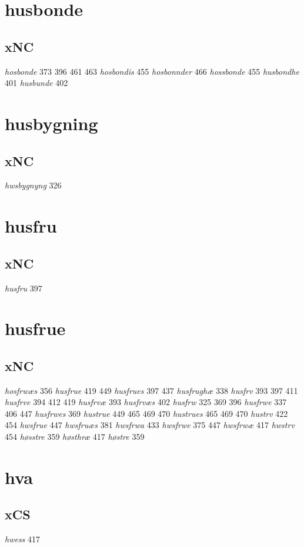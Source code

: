 \documentclass[a4paper,twocolumn]{article}
\begin{document}
\section{husbonde}
\label{sec:org2908d88}
\subsection{xNC}
\label{sec:org9bdc0b9}
\emph{hosbonde} 373 396 461 463 \emph{hosbondis} 455 \emph{hosbonnder} 466 \emph{hossbonde} 455 \emph{husbondhe} 401 \emph{husbunde} 402 
\section{husbygning}
\label{sec:org99ac095}
\subsection{xNC}
\label{sec:org31af51a}
\emph{hwsbygnyng} 326 
\section{husfru}
\label{sec:org5864353}
\subsection{xNC}
\label{sec:orgf42f33d}
\emph{husfru} 397 
\section{husfrue}
\label{sec:org1fd5074}
\subsection{xNC}
\label{sec:org0d43532}
\emph{hosfrwæs} 356 \emph{husfrue} 419 449 \emph{husfrues} 397 437 \emph{husfrughæ} 338 \emph{husfrv} 393 397 411 \emph{husfrve} 394 412 419 \emph{husfrvæ} 393 \emph{husfrvæs} 402 \emph{husfrw} 325 369 396 \emph{husfrwe} 337 406 447 \emph{husfrwes} 369 \emph{hustrue} 449 465 469 470 \emph{hustrues} 465 469 470 \emph{hustrv} 422 454 \emph{hwsfrue} 447 \emph{hwsfruæs} 381 \emph{hwsfrwa} 433 \emph{hwsfrwe} 375 447 \emph{hwsfrwæ} 417 \emph{hwstrv} 454 \emph{høsstre} 359 \emph{høsthræ} 417 \emph{høstre} 359 
\section{hva}
\label{sec:org8de9c33}
\subsection{xCS}
\label{sec:orgad28237}
\emph{hwess} 417 
\end{document}
